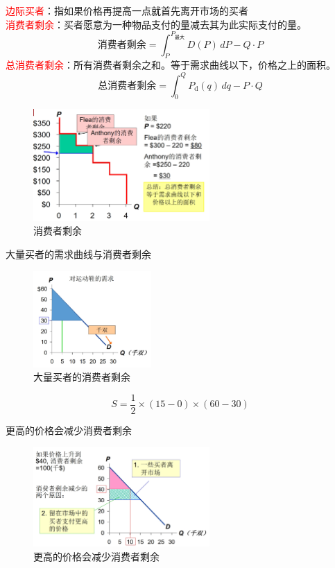 \documentclass[12pt,a4paper]{article}
\begin{document}
\textcolor{red}{边际买者}：指如果价格再提高一点就首先离开市场的买者\\

\textcolor{red}{消费者剩余}：买者愿意为一种物品支付的量减去其为此实际支付的量。
\[
\text{消费者剩余} = \int_{P}^{P_{\text{最大}}} D(P) \, dP - Q \cdot P
\]
\indent\textcolor{red}{总消费者剩余}：所有消费者剩余之和。等于需求曲线以下，价格之上的面积。
\[
\text{总消费者剩余} = \int_{0}^{Q} P_{\text{d}}(q) \, dq - P \cdot Q
\]
\begin{figure}[H] 
  \centering %
  \includegraphics[width=0.6\textwidth]{消费者剩余.png} 
  \caption{消费者剩余} %
\end{figure}
大量买者的需求曲线与消费者剩余\\
\begin{figure}[H] 
  \centering %
  \includegraphics[width=0.4\textwidth]{大量买者的消费者剩余.png} 
  \caption{大量买者的消费者剩余} %
\end{figure}
\[
S = \frac{1}{2} \times (15 - 0) \times (60 - 30)
\]

更高的价格会减少消费者剩余\\
\begin{figure}[H] 
  \centering %
  \includegraphics[width=0.6\textwidth]{更高的价格会减少消费者剩余.png} 
  \caption{更高的价格会减少消费者剩余} %
\end{figure}
\end{document}
